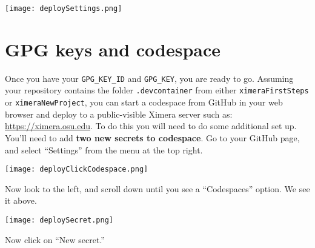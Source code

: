 \documentclass{ximera}
\begin{document}
\begin{image}
    \texttt{[image: deploySettings.png]}
\end{image}
        \section{GPG keys and codespace}
        Once you have your \verb!GPG_KEY_ID! and \verb!GPG_KEY!, you are ready
        to go.
        Assuming your repository contains the folder \verb!.devcontainer! from
        either
        \verb!ximeraFirstSteps! or \verb!ximeraNewProject!, you can
        start a codespace from GitHub in your web browser and deploy to a
        public-visible
        Ximera server such as: \url{https://ximera.osu.edu}.
        To do this you will need to do some additional set up. You'll need to
        add
        \textbf{two
            new
            secrets to codespace}. Go to your GitHub page, and select
        ``Settings''
        from the
        menu at the top right.

        \pdfOnly{\end{multicols}}

\pdfOnly{\newpage}

\begin{image}
    \texttt{[image: deployClickCodespace.png]}
\end{image}

Now look to the left, and scroll down until you see a ``Codespaces'' option.
We see it above.

\newpage

\begin{image}
    \texttt{[image: deploySecret.png]}
\end{image}

Now click on ``New secret.''

\newpage
\end{document}
